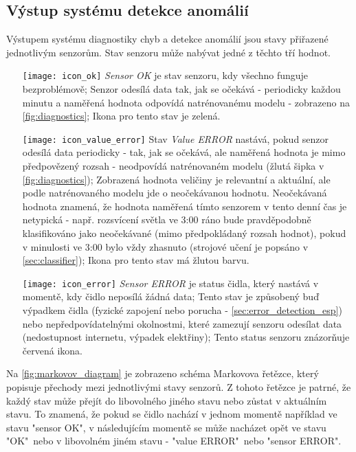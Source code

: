 \subsection*{Výstup systému detekce anomálií} \label{subsec:diagnostics_output}
Výstupem systému diagnostiky chyb a detekce anomálií jsou stavy přiřazené jednotlivým senzorům. Stav senzoru může nabývat jedné z těchto tří hodnot.

\begin{itemize}
  \item [{\texttt{[image: icon\_ok]}}] \textit{Sensor OK} je stav senzoru, kdy všechno funguje bezproblémově; Senzor odesílá data tak, jak se očekává - periodicky každou minutu a naměřená hodnota odpovídá natrénovanému modelu - zobrazeno na \cref{fig:diagnostics}; Ikona pro tento stav je zelená.
  \item [{\texttt{[image: icon\_value\_error]}}] Stav \textit{Value ERROR} nastává, pokud senzor odesílá data periodicky - tak, jak se očekává, ale naměřená hodnota je mimo předpovězený rozsah - neodpovídá natrénovaném modelu (žlutá šipka v \cref{fig:diagnostics}); Zobrazená hodnota veličiny je relevantní a aktuální, ale podle natrénovaného modelu jde o neočekávanou hodnotu. Neočekávaná hodnota znamená, že  hodnota naměřená tímto senzorem v tento denní čas je netypická - např. rozsvícení světla ve 3:00 ráno bude pravděpodobně klasifikováno jako neočekávané (mimo předpokládaný rozsah hodnot), pokud v minulosti ve 3:00 bylo vždy zhasnuto (strojové učení je popsáno v \cref{sec:classifier}); Ikona pro tento stav má žlutou barvu.
  \item [{\texttt{[image: icon\_error]}}] \textit{Sensor ERROR} je status čidla, který nastává v momentě, kdy čidlo neposílá žádná data; Tento stav je způsobený buď výpadkem čidla (fyzické zapojení nebo porucha - \cref{sec:error_detection_esp}) nebo nepředpovídatelnými okolnostmi, které zamezují senzoru odesílat data (nedostupnost internetu, výpadek elektřiny); Tento status senzoru znázorňuje červená ikona.
\end{itemize}

Na \cref{fig:markovov_diagram} je zobrazeno schéma Markovova řetězce, který popisuje přechody mezi jednotlivými stavy senzorů. Z tohoto řetězce je patrné, že každý stav může přejít do libovolného jiného stavu nebo zůstat v aktuálním stavu. To znamená, že pokud se čidlo nachází v jednom momentě například ve stavu "sensor OK", v následujícím momentě se může nacházet opět ve stavu "OK"\ nebo v libovolném jiném stavu - "value ERROR"\ nebo "sensor ERROR".

